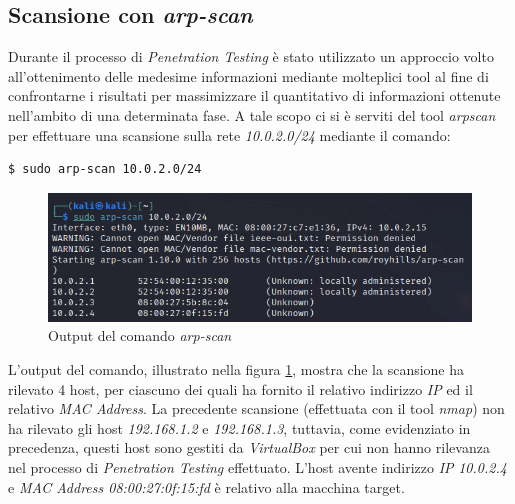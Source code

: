 \subsection{Scansione con \emph{arp-scan}}
Durante il processo di \emph{Penetration Testing} è stato utilizzato un approccio volto all'ottenimento delle medesime informazioni mediante molteplici tool al fine di confrontarne i risultati per massimizzare il quantitativo di informazioni ottenute nell'ambito di una determinata fase. A tale scopo ci si è serviti del tool \emph{arpscan} per effettuare una scansione sulla rete \emph{10.0.2.0/24} mediante il comando:
\begin{lstlisting}[language=bash]
    $ sudo arp-scan 10.0.2.0/24
\end{lstlisting}
\begin{figure}
    \centering
    \includegraphics[scale=0.75]{capitoli/images/arpscan.png}
    \caption{Output del comando \emph{arp-scan}}
    \label{fig:arpscan}
\end{figure}
L'output del comando, illustrato nella figura \ref{fig:arpscan}, mostra che la scansione ha rilevato 4 host, per ciascuno dei quali ha fornito il relativo indirizzo \emph{IP} ed il relativo \emph{MAC Address}. La precedente scansione (effettuata con il tool \emph{nmap}) non ha rilevato gli host \emph{192.168.1.2} e \emph{192.168.1.3}, tuttavia, come evidenziato in precedenza, questi host sono gestiti da \emph{VirtualBox} per cui non hanno rilevanza nel processo di \emph{Penetration Testing} effettuato. L'host avente indirizzo \emph{IP} \emph{10.0.2.4} e \emph{MAC Address 08:00:27:0f:15:fd} è relativo alla macchina target.
